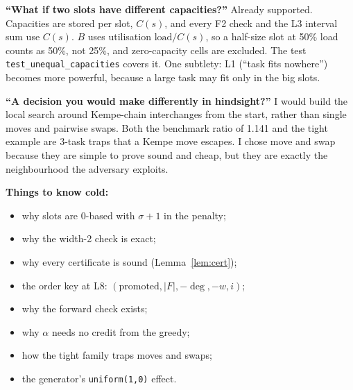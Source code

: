 \textbf{``What if two slots have different capacities?''} Already
supported. Capacities are stored per slot, $C(s)$, and every F2 check and
the L3 interval sum use $C(s)$. $B$ uses utilisation $\text{load}/C(s)$, so
a half-size slot at 50\% load counts as 50\%, not 25\%, and zero-capacity
cells are excluded. The test \texttt{test\_unequal\_capacities} covers it.
One subtlety: L1 (``task fits nowhere'') becomes more powerful, because a
large task may fit only in the big slots.

\textbf{``A decision you would make differently in hindsight?''} I would
build the local search around Kempe-chain interchanges from the start,
rather than single moves and pairwise swaps. Both the benchmark ratio of
1.141 and the tight example are 3-task traps that a Kempe move escapes.
I chose move and swap because they are simple to prove sound and cheap,
but they are exactly the neighbourhood the adversary exploits.

\textbf{Things to know cold:}
\begin{itemize}
\item why slots are 0-based with $\sigma+1$ in the penalty;
\item why the width-2 check is exact;
\item why every certificate is sound (Lemma~\ref{lem:cert});
\item the order key at L8: $(\text{promoted}, |F|, -\deg, -w, i)$;
\item why the forward check exists;
\item why $\alpha$ needs no credit from the greedy;
\item how the tight family traps moves and swaps;
\item the generator's \texttt{uniform(1,0)} effect.
\end{itemize}
